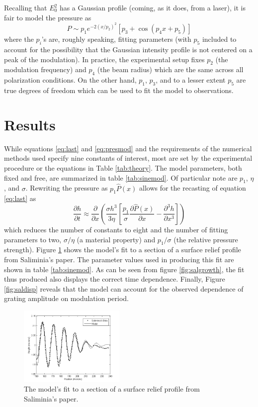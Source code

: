 \documentclass[twocolumn,showpacs,preprintnumbers,amsmath,amssymb]{revtex4}
\begin{document}
Recalling that $E_0^2$ has a Gaussian profile (coming, as it does, from a laser), it is
fair to model the pressure as
\begin{equation}
P\sim p_1 e^{-2\left(x/p_2\right)^2}\left[p_3+\cos\left( p_4 x +p_5\right)\right]
\label{eq:presmod}
\end{equation}
where the $p_i$'s are, roughly speaking, fitting parameters (with $p_5$ included to
account for the possibility that the Gaussian intensity profile is not centered on a peak
of the modulation). In practice, the experimental setup fixes $p_2$ (the modulation
frequency) and $p_4$ (the beam radius) which are the same across all polarization
conditions. On the other hand, $p_1$, $p_3$, and to a lesser extent $p_5$ are true
degrees of freedom which can be used to fit the model to observations.

\section{Results}

While equations \ref{eq:last} and \ref{eq:presmod} and the requirements of the numerical
methods used specify nine constants of interest, most are set by the experimental
procedure or the equations in Table \ref{tab:theory}. The model parameters, both fixed
and free, are summarized in table \ref{tab:sinemod}. Of particular note are $p_1$,
$\eta$, and $\sigma$. Rewriting the pressure as $p_1 \hat{P}(x)$ allows for the recasting
of equation \ref{eq:last} as
\begin{equation}
\frac{\partial h}{\partial t} \approx \frac{\partial}{\partial x}\left(\frac{\sigma
h^3}{3\eta}\left[\frac{p_1}{\sigma}\frac{\partial \hat{P}(x)}{\partial
x}-\frac{\partial^3 h}{\partial x^3}\right]\right) \label{eq:fitmodel}
\end{equation}
which reduces the number of constants to eight and the number of fitting parameters to
two, $\sigma/\eta$ (a material property) and $p_1/\sigma$ (the relative pressure
strength). Figure \ref{fig:sinemodzoom} shows the model's fit to a section of a surface
relief profile from Saliminia's paper. The parameter values used in producing this fit
are shown in table \ref{tab:sinemod}. As can be seen from figure \ref{fig:salgrowth}, the
fit thus produced also displays the correct time dependence. Finally, Figure
\ref{fig:saldisp} reveals that the model can account for the observed dependence of
grating amplitude on modulation period.

\begin{figure}
  \includegraphics[width=2in]{figure/sinefigurezoom.png}
  \caption{The model's fit to a section of a surface relief profile from Saliminia's paper.}
  \label{fig:sinemodzoom}
\end{figure}
\end{document}
